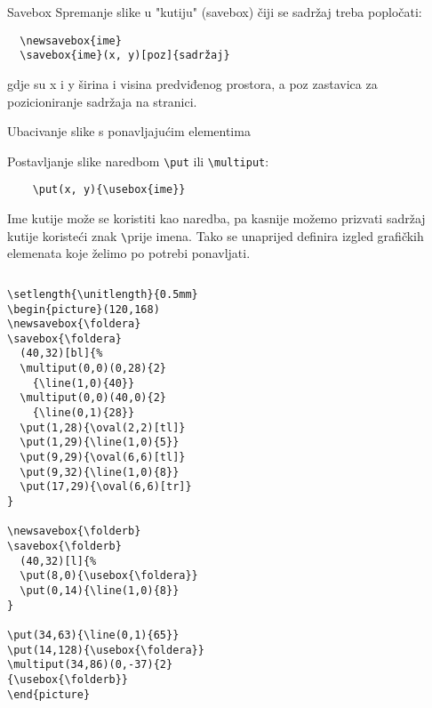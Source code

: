 \begin{frame}{Savebox}
Spremanje slike u "kutiju" (savebox) čiji se sadržaj treba popločati:

\begin{verbatim}
  \newsavebox{ime}
  \savebox{ime}(x, y)[poz]{sadržaj}
\end{verbatim}

gdje su x i y širina i visina predviđenog prostora, a poz zastavica za pozicioniranje sadržaja na stranici.\newpage
\end{frame}

\begin{frame}{Ubacivanje slike s ponavljajućim elementima}

Postavljanje slike naredbom \verb|\put| ili \verb|\multiput|:

\begin{verbatim}
	\put(x, y){\usebox{ime}}
\end{verbatim}

Ime kutije može se koristiti kao naredba, pa kasnije možemo prizvati sadržaj kutije koristeći znak \verb|\|prije imena.
Tako se unaprijed definira izgled grafičkih elemenata koje želimo po potrebi ponavljati.\newpage
\begin{columns}[c]

\begin{column}{0.5\textwidth}

\begin{Verbatim}[fontsize=\tiny]
\setlength{\unitlength}{0.5mm}
\begin{picture}(120,168)
\newsavebox{\foldera}
\savebox{\foldera}
  (40,32)[bl]{%
  \multiput(0,0)(0,28){2}
    {\line(1,0){40}}
  \multiput(0,0)(40,0){2}
    {\line(0,1){28}}
  \put(1,28){\oval(2,2)[tl]}
  \put(1,29){\line(1,0){5}}
  \put(9,29){\oval(6,6)[tl]}
  \put(9,32){\line(1,0){8}}
  \put(17,29){\oval(6,6)[tr]}
}

\newsavebox{\folderb}
\savebox{\folderb}
  (40,32)[l]{%
  \put(8,0){\usebox{\foldera}}
  \put(0,14){\line(1,0){8}}
}

\put(34,63){\line(0,1){65}}
\put(14,128){\usebox{\foldera}}
\multiput(34,86)(0,-37){2}
{\usebox{\folderb}}
\end{picture}
\end{Verbatim}

\end{column}

\begin{column}{0.5\textwidth}%


\end{column}
\end{columns}
\end{frame}

